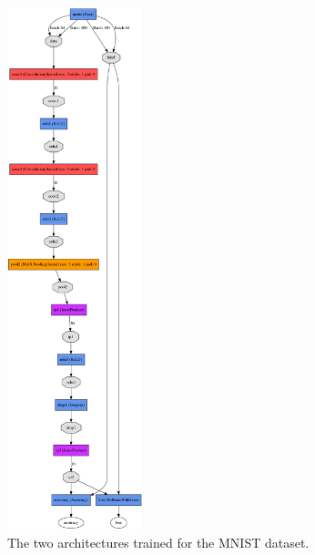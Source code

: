 \documentclass[5pt]{article}
\begin{document}
\begin{figure}[T]
  \includegraphics[width=0.35\textwidth]{images/mnist_arch2.png}
  \caption{The two architectures trained for the MNIST dataset.}
\label{fig:mnist_architectures}
\end{figure}
\end{document}
